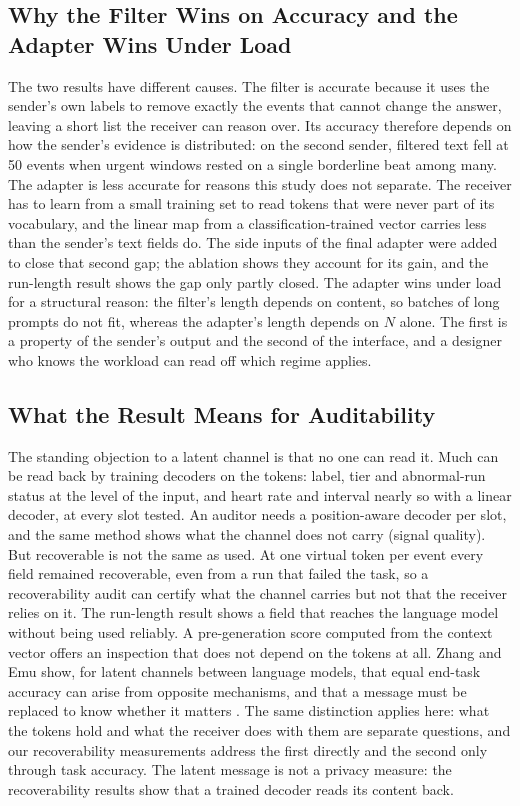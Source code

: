 \subsection{Why the Filter Wins on Accuracy and the Adapter Wins Under Load}
The two results have different causes. The filter is accurate because it uses the sender's own labels to remove exactly the events that cannot change the answer, leaving a short list the receiver can reason over. Its accuracy therefore depends on how the sender's evidence is distributed: on the second sender, filtered text fell at 50 events when urgent windows rested on a single borderline beat among many. The adapter is less accurate for reasons this study does not separate. The receiver has to learn from a small training set to read tokens that were never part of its vocabulary, and the linear map from a classification-trained vector carries less than the sender's text fields do. The side inputs of the final adapter were added to close that second gap; the ablation shows they account for its gain, and the run-length result shows the gap only partly closed. The adapter wins under load for a structural reason: the filter's length depends on content, so batches of long prompts do not fit, whereas the adapter's length depends on $N$ alone. The first is a property of the sender's output and the second of the interface, and a designer who knows the workload can read off which regime applies.

\subsection{What the Result Means for Auditability}
The standing objection to a latent channel is that no one can read it. Much can be read back by training decoders on the tokens: label, tier and abnormal-run status at the level of the input, and heart rate and interval nearly so with a linear decoder, at every slot tested. An auditor needs a position-aware decoder per slot, and the same method shows what the channel does not carry (signal quality). But recoverable is not the same as used. At one virtual token per event every field remained recoverable, even from a run that failed the task, so a recoverability audit can certify what the channel carries but not that the receiver relies on it. The run-length result shows a field that reaches the language model without being used reliably. A pre-generation score computed from the context vector offers an inspection that does not depend on the tokens at all. Zhang and Emu show, for latent channels between language models, that equal end-task accuracy can arise from opposite mechanisms, and that a message must be replaced to know whether it matters \cite{zhang2026causalaudit}. The same distinction applies here: what the tokens hold and what the receiver does with them are separate questions, and our recoverability measurements address the first directly and the second only through task accuracy. The latent message is not a privacy measure: the recoverability results show that a trained decoder reads its content back.

